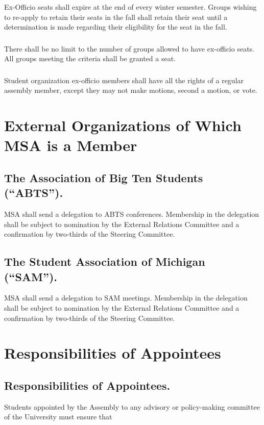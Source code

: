 \subsubsection{}
Ex-Officio seats shall expire at the end of every winter semester. Groups wishing to re-apply to retain their seats in the fall shall retain their seat until a determination is made regarding their eligibility for the seat in the fall.
\subsubsection{}
There shall be no limit to the number of groups allowed to have ex-officio seats. All groups meeting the criteria shall be granted a seat.
\subsubsection{}
Student organization ex-officio members shall have all the rights of a regular assembly member, except they may not make motions, second a motion, or vote.


\section{External Organizations of Which MSA is a Member}

\subsection{The Association of Big Ten Students (``ABTS'').}
MSA shall send a delegation to ABTS conferences.  Membership in the delegation shall be subject to nomination by the External Relations Committee and a confirmation by two-thirds of the Steering Committee.   

\subsection{The Student Association of Michigan (``SAM'').}
MSA shall send a delegation to SAM meetings.  Membership in the delegation shall be subject to nomination by the External Relations Committee and a confirmation by two-thirds of the Steering Committee.


\section{Responsibilities of Appointees}

\subsection{Responsibilities of Appointees.}  Students appointed by the Assembly to any advisory or policy-making committee of the University must ensure that
